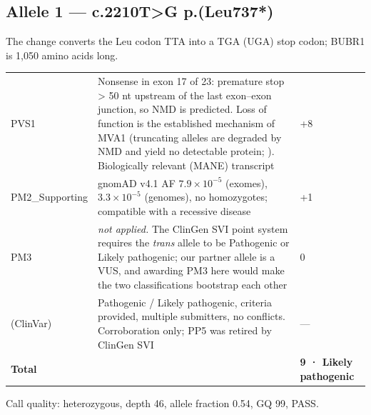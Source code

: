 \documentclass[10pt]{article}
\begin{document}
\subsection{Allele 1 — c.2210T>G p.(Leu737*)}
The change converts the Leu codon TTA into a TGA (UGA) stop codon; BUBR1 is 1,050 amino acids long.

\begin{table}[H]\tablefont
\begin{tabularx}{\linewidth}{@{}P{2.75cm}LP{1.6cm}@{}}
\toprule{} &  & \\\midrule
PVS1 & Nonsense in exon 17 of 23: premature stop > 50 nt upstream of the last exon–exon junction, so NMD is predicted. Loss of function is the established mechanism of MVA1 (truncating alleles are degraded by NMD and yield no detectable protein; \citealp{suij}). Biologically relevant (MANE) transcript & +8\\
PM2\_Supporting & gnomAD v4.1 AF $7.9\times10^{-5}$ (exomes), $3.3\times10^{-5}$ (genomes), no homozygotes; compatible with a recessive disease & +1\\
PM3 & \emph{not applied.} The ClinGen SVI point system requires the \emph{trans} allele to be Pathogenic or Likely pathogenic; our partner allele is a VUS, and awarding PM3 here would make the two classifications bootstrap each other & 0\\
(ClinVar) & Pathogenic / Likely pathogenic, criteria provided, multiple submitters, no conflicts. Corroboration only; PP5 was retired by ClinGen SVI & —\\\midrule
\textbf{Total} & & \textbf{9 · Likely pathogenic}\\\bottomrule
\end{tabularx}\end{table}
Call quality: heterozygous, depth 46, allele fraction 0.54, GQ 99, PASS.
\end{document}
